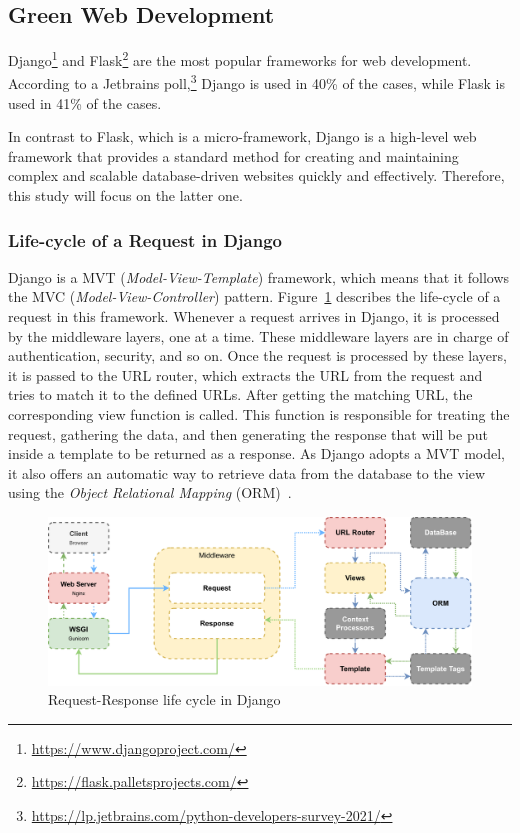 \subsection{Green Web Development}\label{sec:webdev}

Django\footnote{\url{https://www.djangoproject.com/}} and Flask\footnote{\url{https://flask.palletsprojects.com/}} are the most popular frameworks for web development.
According to a Jetbrains poll,\footnote{\url{https://lp.jetbrains.com/python-developers-survey-2021/}} Django is used in 40\% of the cases, while Flask is used in 41\% of the cases.

In contrast to Flask, which is a micro-framework, Django is a high-level web framework that provides a standard method for creating and maintaining complex and scalable database-driven websites quickly and effectively.
Therefore, this study will focus on the latter one.

\subsubsection{Life-cycle of a Request in Django}
Django is a MVT (\emph{Model-View-Template}) framework, which means that it follows the MVC (\emph{Model-View-Controller}) pattern.
Figure~\ref{fig:django-life-cycle} describes the life-cycle of a request in this framework.
Whenever a request arrives in Django, it is processed by the middleware layers, one at a time.
These middleware layers are in charge of authentication, security, and so on.
Once the request is processed by these layers, it is passed to the URL router, which extracts the URL from the request and tries to match it to the defined URLs.
After getting the matching URL, the corresponding view function is called.
This function is responsible for treating the request, gathering the data, and then generating the response that will be put inside a template to be returned as a response.
As Django adopts a MVT model, it also offers an automatic way to retrieve data from the database to the view using the \emph{Object Relational Mapping} (ORM)~\cite{o2008object}.

\begin{figure}[!htb]
    \centering
    \includegraphics[width=\linewidth]{imgs/django_request_lifecycle}
    \caption{Request-Response life cycle in Django}
    \label{fig:django-life-cycle}
\end{figure}

